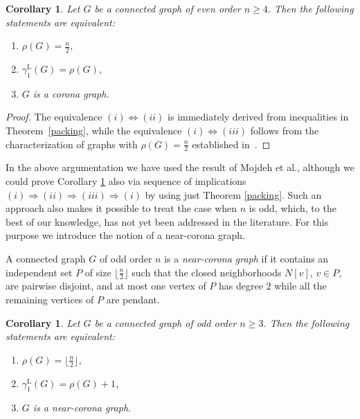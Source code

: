 \documentclass[11pt]{article}
\newtheorem{corollary}[theorem]{Corollary}
\newcommand{\gammaenaL}{\gamma_1^{\mathrm L}}
\begin{document}
\begin{corollary}\label{n-sod}
Let $G$ be a connected graph of even order $n\ge 4$. Then the following
statements are equivalent:
\begin{enumerate}
\item[(i)] $\rho(G)=\frac n2$,
\item[(ii)] $\gammaenaL(G)=\rho(G)$,
\item[(iii)] $G$ is a corona graph.
\end{enumerate}
\end{corollary}

\begin{proof} The equivalence $(i)\Leftrightarrow(ii)$ is immediately derived from inequalities in 
Theorem~\ref{packing}, while the equivalence $(i)\Leftrightarrow(iii)$ 
follows from the characterization of graphs with $\rho(G)=\frac n2$ 
established in~\cite{packing}.
\end{proof}


In the above argumentation we have used the result of Mojdeh et al., although we could prove Corollary \ref{n-sod} also via sequence of implications $(i) \Rightarrow(ii) \Rightarrow(iii) \Rightarrow (i)$  by using just Theorem \ref{packing}. Such an approach also makes it possible to treat the case when 
$n$ is odd, which, to the best of our knowledge, has not yet been addressed in the literature. For this purpose we introduce the notion of a near-corona graph.

A connected graph $G$ of odd order $n$ is a \emph{near-corona graph} if it contains an independent set 
$P$ of size $\lfloor\frac n2 \rfloor$ such that the closed neighborhoods $N[v]$, 
$v \in P$, are pairwise disjoint, and at most one vertex of $P$ has degree $2$ 
while all the remaining vertices of $P$ are pendant.




\begin{corollary}\label{n-lih}
Let $G$ be a connected graph of odd order $n\ge 3$. Then the following
statements are equivalent:
\begin{enumerate}
\item[(i)] $\rho(G)=\lfloor\frac n2 \rfloor$,
\item[(ii)] $\gammaenaL(G)=\rho(G)+1$,
\item[(iii)] $G$ is a near-corona graph.
\end{enumerate}
\end{corollary}
\end{document}
